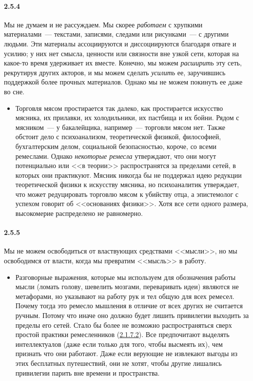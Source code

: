 \paragraph{2.5.4}\hypertarget{par:2.5.4}{} Мы не думаем и не рассуждаем. Мы скорее {\itshape работаем} с хрупкими материалами~--- текстами, записями, следами или рисунками~--- с другими людьми. Эти материалы ассоциируются и диссоциируются благодаря отваге и усилию; у них нет смысла, ценности или связности вне узкой сети, которая на какое-то время удерживает их вместе. Конечно, мы можем {\itshape расширить} эту сеть, рекрутируя других акторов, и мы можем сделать {\itshape усилить} ее, заручившись поддержкой более прочных материалов. Однако мы не можем покинуть ее даже во сне.
	\begin{itemize}
	\item 
	Торговля мясом простирается так далеко, как простирается искусство мясника, их прилавки, их холодильники, их пастбища и их бойни. Рядом с мясником~--- у бакалейщика, например~--- торговли мясом нет. Также обстоит дело с психоанализом, теоретической физикой, философией, бухгалтерским делом, социальной безопасностью, короче, со всеми ремеслами. Однако {\itshape некоторые ремесла }утверждают, что они могут потенциально или <<в теории>> распространятся за пределами сетей, в которых они практикуют. Мясник никогда бы не поддержал идею редукции теоретической физики к искусству мясника, но психоаналитик утверждает, что может редуцировать торговлю мясом к убийству отца, а эпистемолог с успехом говорит об <<основаниях физики>>. Хотя все сети одного размера, высокомерие распределено не равномерно.
	\end{itemize}

\paragraph{2.5.5}\hypertarget{par:2.5.5}{} Мы не можем освободиться от властвующих средствами <<мысли>>, но мы освободимся от власти, когда мы превратим <<мысль>> в работу. 
	\begin{itemize}
	\item 
	Разговорные выражения, которые мы используем для обозначения работы мысли (ломать голову, шевелить мозгами, переваривать идеи) являются не метафорами, но указывают на работу рук и тел общую для всех ремесел. Почему тогда это ремесло мышления в отличие от всех других не считается ручным. Потому что иначе оно должно будет лишить привилегии выходить за пределы его сетей. Стало бы более не возможно распространяться сверх простой практики ремесленников (\hyperlink{par:2.1.7.2}{2.1.7.2}). Все предпочитают выделять интеллектуалов (даже если только для того, чтобы высмеять их), чем признать что они работают. Даже если верующие не извлекают выгоды из этих бесплатных путешествий, они не хотят, чтобы другие лишались привилегии парить вне времени и пространства.
	\end{itemize}

